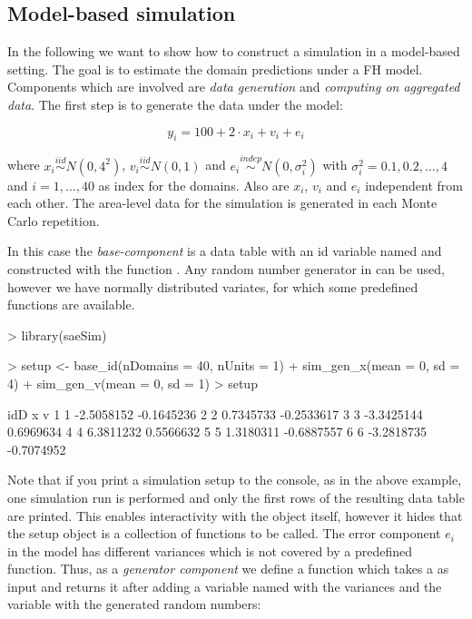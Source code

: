 \documentclass[article]{ajs}
\begin{document}
\subsection{Model-based simulation}
\label{sec:csModel}
In the following we want to show how to construct a simulation in a model-based setting. The goal is to estimate the domain predictions under a FH model. Components which are involved are \textit{data generation} and \textit{computing on aggregated data}. The first step is to generate the data under the model:

\[ y_i = 100 + 2 \cdot x_i + v_i + e_i\]

where $x_i \stackrel{iid}{\sim} N(0, 4^2)$, $v_i \stackrel{iid}{\sim} N(0, 1)$ and $e_i \stackrel{indep}{\sim} N(0, \sigma_i^2)$ with $\sigma_i^2 = 0.1, 0.2, \dots, 4$ and $i = 1, \dots, 40$ as index for the domains. Also are $x_i$, $v_i$ and $e_i$ independent from each other. The area-level data for the simulation is generated in each Monte Carlo repetition. 

In this case the \textit{base-component} is a data table with an id variable named  and constructed with the function . Any random number generator in  can be used, however we have normally distributed variates, for which some predefined functions are available.

\begin{Schunk}
\begin{Sinput}
> library(saeSim)
\end{Sinput}
\end{Schunk}
\begin{Schunk}
\begin{Sinput}
> setup <- base_id(nDomains = 40, nUnits = 1) %
+   sim_gen_x(mean = 0, sd = 4) %
+   sim_gen_v(mean = 0, sd = 1)
> setup
\end{Sinput}
\begin{Soutput}
  idD          x          v
1   1 -2.5058152 -0.1645236
2   2  0.7345733 -0.2533617
3   3 -3.3425144  0.6969634
4   4  6.3811232  0.5566632
5   5  1.3180311 -0.6887557
6   6 -3.2818735 -0.7074952
\end{Soutput}
\end{Schunk}

Note that if you print a simulation setup to the console, as in the above example, one simulation run is performed and only the first rows of the resulting data table are printed. This enables interactivity with the object itself, however it hides that the setup object is a collection of functions to be called. The error component $e_i$ in the model has different variances which is not covered by a predefined function. Thus, as a \textit{generator component} we define a function which takes a  as input and returns it after adding a variable named  with the variances and the variable  with the generated random numbers:
\end{document}
